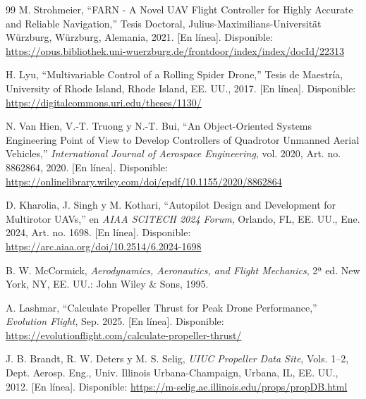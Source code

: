 \documentclass[12pt, letterpaper]{report}
\begin{document}

\begin{thebibliography}{99}
     M. Strohmeier, ``FARN - A Novel UAV Flight Controller for Highly Accurate and Reliable Navigation,'' Tesis Doctoral, Julius-Maximilians-Universität Würzburg, Würzburg, Alemania, 2021. [En línea]. Disponible: \url{https://opus.bibliothek.uni-wuerzburg.de/frontdoor/index/index/docId/22313}

     H. Lyu, ``Multivariable Control of a Rolling Spider Drone,'' Tesis de Maestría, University of Rhode Island, Rhode Island, EE. UU., 2017. [En línea]. Disponible: \url{https://digitalcommons.uri.edu/theses/1130/}

     N. Van Hien, V.-T. Truong y N.-T. Bui, ``An Object-Oriented Systems Engineering Point of View to Develop Controllers of Quadrotor Unmanned Aerial Vehicles,'' \textit{International Journal of Aerospace Engineering}, vol. 2020, Art. no. 8862864, 2020. [En línea]. Disponible: \url{https://onlinelibrary.wiley.com/doi/epdf/10.1155/2020/8862864}

     D. Kharolia, J. Singh y M. Kothari, ``Autopilot Design and Development for Multirotor UAVs,'' en \textit{AIAA SCITECH 2024 Forum}, Orlando, FL, EE. UU., Ene. 2024, Art. no. 1698. [En línea]. Disponible: \url{https://arc.aiaa.org/doi/10.2514/6.2024-1698}

     B. W. McCormick, \textit{Aerodynamics, Aeronautics, and Flight Mechanics}, 2ª ed. New York, NY, EE. UU.: John Wiley \& Sons, 1995.

     A. Lashmar, ``Calculate Propeller Thrust for Peak Drone Performance,'' \textit{Evolution Flight}, Sep. 2025. [En línea]. Disponible: \url{https://evolutionflight.com/calculate-propeller-thrust/}

     J. B. Brandt, R. W. Deters y M. S. Selig, \textit{UIUC Propeller Data Site}, Vols. 1--2, Dept. Aerosp. Eng., Univ. Illinois Urbana-Champaign, Urbana, IL, EE. UU., 2012. [En línea]. Disponible: \url{https://m-selig.ae.illinois.edu/props/propDB.html}
\end{thebibliography}
\end{document}
